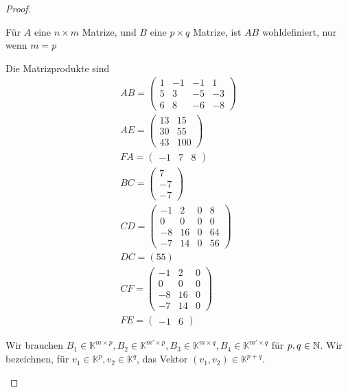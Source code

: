 \begin{proof}
	\begin{parts}
	\item F\"{u}r $A$ eine $n\times m$ Matrize, und $B$ eine $p\times q$ Matrize, ist $AB$ wohldefiniert, nur wenn $m=p$

		Die Matrizprodukte sind
		\begin{gather*}
			AB=\begin{pmatrix} 1 & -1 & -1 & 1\\5 & 3 & -5 & -3 \\ 6 & 8 & -6 & -8 \end{pmatrix}\\
			AE=\begin{pmatrix} 13 & 15 \\ 30 & 55 \\ 43 & 100 \end{pmatrix} \\
			FA=\begin{pmatrix} -1 & 7 & 8 \end{pmatrix}\\ 
			BC=\begin{pmatrix} 7 \\ -7 \\ -7 \end{pmatrix}\\
			CD=\begin{pmatrix} -1 & 2 & 0 & 8 \\ 0 & 0 & 0 & 0\\-8 & 16 & 0 & 64\\-7 & 14 & 0 & 56 \end{pmatrix}\\
			DC=(55)\\
			CF=\begin{pmatrix} -1 & 2 & 0 \\ 0 & 0 & 0 \\ -8 & 16 & 0\\-7 & 14 & 0 \end{pmatrix}\\ 
			FE=\begin{pmatrix} -1 & 6 \end{pmatrix} 
		\end{gather*}
	\item Wir brauchen $B_1\in\mathbb{K}^{m\times p},B_2\in\mathbb{K}^{m'\times p}, B_3\in\mathbb{K}^{m\times q}, B_4\in\mathbb{K}^{m'\times q}$ f\"{u}r $p,q\in \mathbb{N}$. Wir bezeichnen, f\"{u}r $v_1\in\mathbb{K}^p,v_2\in\mathbb{K}^q$, das Vektor $(v_1,v_2)\in\mathbb{K}^{p+q}$.
	\end{parts}
\end{proof}
